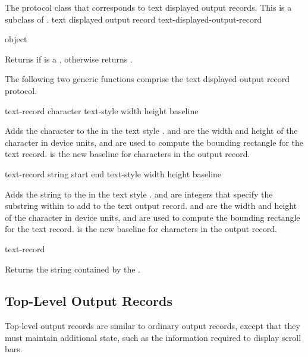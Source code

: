 
The protocol class that corresponds to text displayed output records.  This is
a subclass of .
 {text displayed output record} {text-displayed-output-record}

 {object}

Returns  if  is a ,
otherwise returns .

The following two generic functions comprise the text displayed output record
protocol.

 {text-record character text-style 
                                                   width height baseline}

Adds the character  to the 
 in the text style .   and
 are the width and height of the character in device units, and are
used to compute the bounding rectangle for the text record.   is
the new baseline for characters in the output record.

 {text-record string start end text-style 
                                                width height baseline}

Adds the string  to the 
 in the text style .   and 
are integers that specify the substring within  to add to the text
output record.   and  are the width and height of the
character in device units, and are used to compute the bounding rectangle for
the text record.   is the new baseline for characters in the
output record.

 {text-record}

Returns the string contained by the 
.
\ReadOnly


\subsection {Top-Level Output Records}

Top-level output records are similar to ordinary output records, except that
they must maintain additional state, such as the information required to display
scroll bars.

